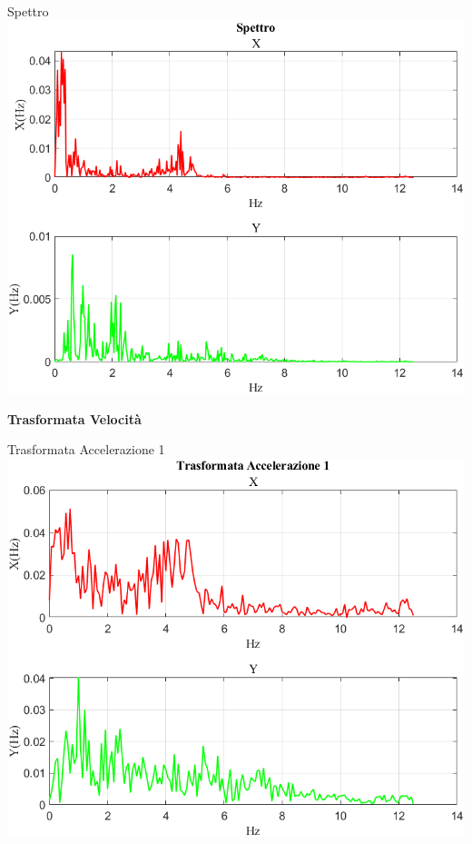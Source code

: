 \documentclass[beamer]{standalone}
\begin{document}
	\begin{frame}{{Spettro}}
		\centering\includegraphics[height=.8\textheight]{figure/Vel/Trasformata/Spettro}
	\end{frame}
	
	\begin{frame}
		\color{blue}\centering\huge{\textbf{Trasformata Velocità}}
	\end{frame}
	
	\begin{frame}{{Trasformata Accelerazione 1}}
		\centering\includegraphics[height=.8\textheight]{figure/Vel/Trasformata/Trasformata Accelerazione 1}
	\end{frame}
	
\end{document}
